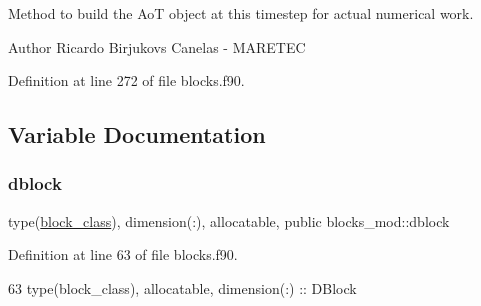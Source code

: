 Method to build the AoT object at this timestep for actual numerical work. 

\begin{DoxyAuthor}{Author}
Ricardo Birjukovs Canelas -\/ M\+A\+R\+E\+T\+EC 
\end{DoxyAuthor}


Definition at line 272 of file blocks.\+f90.




\subsection{Variable Documentation}
\mbox{\label{namespaceblocks__mod_ac8ad6e3cf7a812f95dadb592336aca50}} 
\subsubsection{\texorpdfstring{dblock}{dblock}}
{\footnotesize\ttfamily type(\mbox{\hyperlink{structblocks__mod_1_1block__class}{block\+\_\+class}}), dimension(\+:), allocatable, public blocks\+\_\+mod\+::dblock}



Definition at line 63 of file blocks.\+f90.


\begin{DoxyCode}
63     \textcolor{keywordtype}{type}(block\_class), \textcolor{keywordtype}{allocatable}, \textcolor{keywordtype}{dimension(:)} :: DBlock
\end{DoxyCode}
